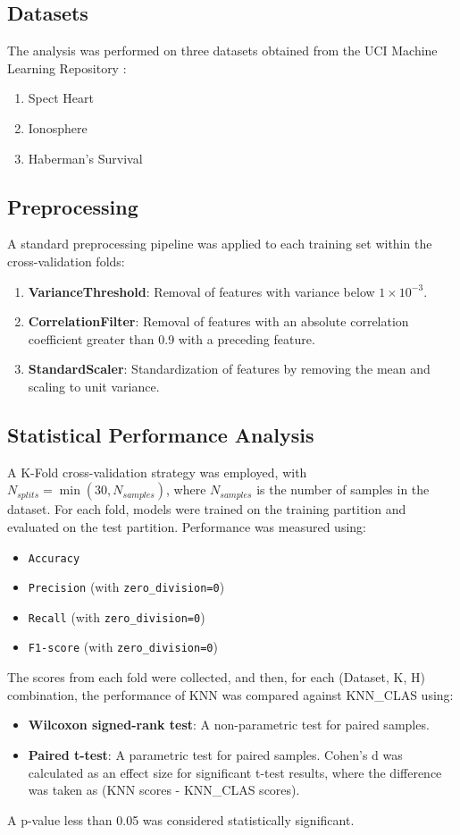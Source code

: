 \documentclass[conference]{IEEEtran}
\begin{document}
\subsection{Datasets}
The analysis was performed on three datasets obtained from the UCI Machine Learning Repository \cite{Dua:2019}:
\begin{enumerate}
    \item Spect Heart
    \item Ionosphere
    \item Haberman's Survival
\end{enumerate}

\subsection{Preprocessing}
A standard preprocessing pipeline was applied to each training set within the cross-validation folds:
\begin{enumerate}
    \item \textbf{VarianceThreshold}: Removal of features with variance below $1 \times 10^{-3}$.
    \item \textbf{CorrelationFilter}: Removal of features with an absolute correlation coefficient greater than 0.9 with a preceding feature.
    \item \textbf{StandardScaler}: Standardization of features by removing the mean and scaling to unit variance.
\end{enumerate}

\subsection{Statistical Performance Analysis}
A K-Fold cross-validation strategy was employed, with $N_{splits} = \min(30, N_{samples})$, where $N_{samples}$ is the number of samples in the dataset. For each fold, models were trained on the training partition and evaluated on the test partition. Performance was measured using:
\begin{itemize}
    \item \texttt{Accuracy}
        \item \texttt{Precision} (with \texttt{zero\_division=0})
        \item \texttt{Recall} (with \texttt{zero\_division=0})
        \item \texttt{F1-score} (with \texttt{zero\_division=0})
\end{itemize}
The scores from each fold were collected, and then, for each (Dataset, K, H) combination, the performance of KNN was compared against KNN\_CLAS using:
\begin{itemize}
    \item \textbf{Wilcoxon signed-rank test}: A non-parametric test for paired samples.
    \item \textbf{Paired t-test}: A parametric test for paired samples. Cohen's d was calculated as an effect size for significant t-test results, where the difference was taken as (KNN scores - KNN\_CLAS scores).
\end{itemize}
A p-value less than 0.05 was considered statistically significant.
\end{document}
